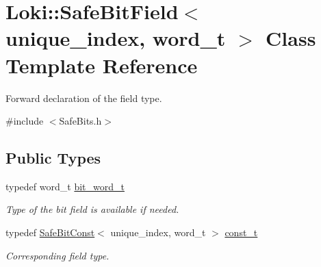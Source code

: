 \hypertarget{classLoki_1_1SafeBitField}{}\section{Loki\+:\+:Safe\+Bit\+Field$<$ unique\+\_\+index, word\+\_\+t $>$ Class Template Reference}
\label{classLoki_1_1SafeBitField}


Forward declaration of the field type.  




{\ttfamily \#include $<$Safe\+Bits.\+h$>$}

\subsection*{Public Types}
\begin{DoxyCompactItemize}
\item 
\hypertarget{classLoki_1_1SafeBitField_ad3da49f8be66897441d2eddd97eeda8d}{}typedef word\+\_\+t \hyperlink{classLoki_1_1SafeBitField_ad3da49f8be66897441d2eddd97eeda8d}{bit\+\_\+word\+\_\+t}\label{classLoki_1_1SafeBitField_ad3da49f8be66897441d2eddd97eeda8d}

\begin{DoxyCompactList}\small\item\em Type of the bit field is available if needed. \end{DoxyCompactList}\item 
\hypertarget{classLoki_1_1SafeBitField_aa8ac2761b53243b4648a61263ef91665}{}typedef \hyperlink{classLoki_1_1SafeBitConst}{Safe\+Bit\+Const}$<$ unique\+\_\+index, word\+\_\+t $>$ \hyperlink{classLoki_1_1SafeBitField_aa8ac2761b53243b4648a61263ef91665}{const\+\_\+t}\label{classLoki_1_1SafeBitField_aa8ac2761b53243b4648a61263ef91665}

\begin{DoxyCompactList}\small\item\em Corresponding field type. \end{DoxyCompactList}\end{DoxyCompactItemize}
